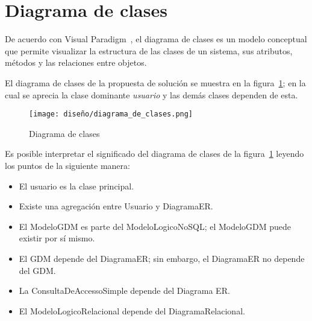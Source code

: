 \section{Diagrama de clases}

De acuerdo con Visual Paradigm~\cite{paradigm_visual_2020}, el diagrama de clases es un modelo conceptual que permite visualizar la estructura de las clases de un sistema, sus atributos, métodos y las relaciones entre objetos.


El diagrama de clases de la propuesta de solución se muestra en la figura~\ref{img:classes_diagram}; en la cual se aprecia la clase dominante \textit{usuario} y las demás clases dependen de esta.


\begin{figure}[H]
  \centering
  \texttt{[image: diseño/diagrama\_de\_clases.png]}
  \caption{Diagrama de clases}
  \label{img:classes_diagram}
\end{figure}

Es posible interpretar el significado del diagrama de clases de la figura~\ref{img:classes_diagram} leyendo los puntos de la siguiente manera:

\begin{itemize}
  \item El usuario es la clase principal.
  \item Existe una agregación entre Usuario y DiagramaER.
  \item El ModeloGDM es parte del ModeloLogicoNoSQL; el ModeloGDM puede existir por sí mismo.
  \item El GDM depende del DiagramaER; sin embargo, el DiagramaER no depende del GDM.
  \item La ConsultaDeAccessoSimple depende del Diagrama ER.
  \item El ModeloLogicoRelacional depende del DiagramaRelacional.
\end{itemize}


